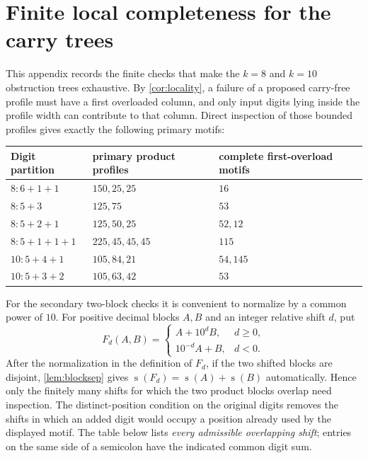\documentclass[11pt]{article}
\newcommand{\ds}{\operatorname{s}}
\begin{document}
\section{Finite local completeness for the carry trees}\label{app:local}
This appendix records the finite checks that make the $k=8$ and $k=10$ obstruction trees exhaustive.  By \cref{cor:locality}, a failure of a proposed carry-free profile must have a first overloaded column, and only input digits lying inside the profile width can contribute to that column.  Direct inspection of those bounded profiles gives exactly the following primary motifs:

\begin{center}
\footnotesize
\setlength{\tabcolsep}{4pt}
\begin{tabular}{@{}lll@{}}
\toprule
Digit partition & primary product profiles & complete first-overload motifs \\
\midrule
$8:6+1+1$ & $150,25,25$ & $16$ \\
$8:5+3$ & $125,75$ & $53$ \\
$8:5+2+1$ & $125,50,25$ & $52,12$ \\
$8:5+1+1+1$ & $225,45,45,45$ & $115$ \\
$10:5+4+1$ & $105,84,21$ & $54,145$ \\
$10:5+3+2$ & $105,63,42$ & $53$ \\
\bottomrule
\end{tabular}
\end{center}

For the secondary two-block checks it is convenient to normalize by a common power of $10$.  For positive decimal blocks $A,B$ and an integer relative shift $d$, put
\[
 F_d(A,B)=
 \begin{cases}
  A+10^dB,&d\ge0,\\
  10^{-d}A+B,&d<0.
 \end{cases}
\]
After the normalization in the definition of $F_d$, if the two shifted blocks are disjoint, \cref{lem:blocksep} gives $\ds(F_d)=\ds(A)+\ds(B)$ automatically.  Hence only the finitely many shifts for which the two product blocks overlap need inspection.  The distinct-position condition on the original digits removes the shifts in which an added digit would occupy a position already used by the displayed motif.  The table below lists \emph{every admissible overlapping shift}; entries on the same side of a semicolon have the indicated common digit sum.
\end{document}

